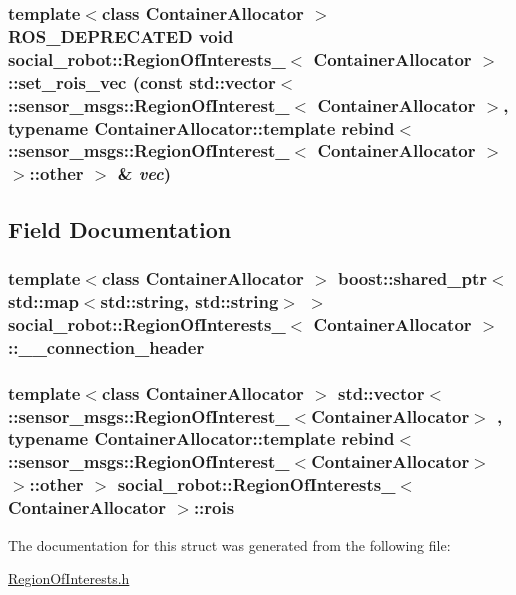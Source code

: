\label{structsocial__robot_1_1RegionOfInterests___a23f551dd5898a5fabd6af746ba4a658a}
\hypertarget{structsocial__robot_1_1RegionOfInterests___ad9f0ddeec75b0c2a9922941fe9f45bcc}{
\subsubsection[{set\_\-rois\_\-vec}]{\setlength{\rightskip}{0pt plus 5cm}template$<$class ContainerAllocator $>$ ROS\_\-DEPRECATED void {\bf social\_\-robot::RegionOfInterests\_\-}$<$ ContainerAllocator $>$::set\_\-rois\_\-vec (const std::vector$<$ ::sensor\_\-msgs::RegionOfInterest\_\-$<$ ContainerAllocator $>$, typename ContainerAllocator::template rebind$<$ ::sensor\_\-msgs::RegionOfInterest\_\-$<$ ContainerAllocator $>$ $>$::other $>$ \& {\em vec})}}
\label{structsocial__robot_1_1RegionOfInterests___ad9f0ddeec75b0c2a9922941fe9f45bcc}


\subsection{Field Documentation}
\hypertarget{structsocial__robot_1_1RegionOfInterests___a6db3b3241debb769e8fabcc70f942f62}{
\subsubsection[{\_\-\_\-connection\_\-header}]{\setlength{\rightskip}{0pt plus 5cm}template$<$class ContainerAllocator $>$ boost::shared\_\-ptr$<$std::map$<$std::string, std::string$>$ $>$ {\bf social\_\-robot::RegionOfInterests\_\-}$<$ ContainerAllocator $>$::{\bf \_\-\_\-connection\_\-header}}}
\label{structsocial__robot_1_1RegionOfInterests___a6db3b3241debb769e8fabcc70f942f62}
\hypertarget{structsocial__robot_1_1RegionOfInterests___a0881ddf8626d1d5a416448aabb5651bc}{
\subsubsection[{rois}]{\setlength{\rightskip}{0pt plus 5cm}template$<$class ContainerAllocator $>$ std::vector$<$ ::sensor\_\-msgs::RegionOfInterest\_\-$<$ContainerAllocator$>$ , typename ContainerAllocator::template rebind$<$ ::sensor\_\-msgs::RegionOfInterest\_\-$<$ContainerAllocator$>$ $>$::other $>$ {\bf social\_\-robot::RegionOfInterests\_\-}$<$ ContainerAllocator $>$::{\bf rois}}}
\label{structsocial__robot_1_1RegionOfInterests___a0881ddf8626d1d5a416448aabb5651bc}


The documentation for this struct was generated from the following file:\begin{DoxyCompactItemize}
\item 
\hyperlink{RegionOfInterests_8h}{RegionOfInterests.h}\end{DoxyCompactItemize}
